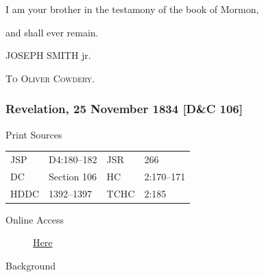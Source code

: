 					\begin{tightright}
						I am your brother in the testamony of the book of Mormon,
					\end{tightright}
					
					\begin{tightcenter}
						and shall ever remain.
					\end{tightcenter}

					\begin{tightright}
						JOSEPH SMITH jr.
					\end{tightright}

					\textsc{To Oliver Cowdery}.

		\subsubsection{Revelation, 25 November 1834 [D\&C 106]}
			\label{EMS-1834-JS-25-NOV-1834}
			
			\begin{description}
					\item[Print Sources]
				\end{description}

					\begin{tabular}{p{0.5in}p{1in}p{0.5in}p{1in}}
					JSP	 	& D4:180--182		& JSR 		& 266 \\
					DC	 	& Section 106		& HC 		& 2:170--171 \\
					HDDC 	& 1392--1397		& TCHC 		& 2:185 \\
					\end{tabular}
				
				\begin{description}
					\item[Online Access] \href{https://www.josephsmithpapers.org/paper-summary/revelation-25-november-1834-dc-106/1}{Here}
				\end{description}
				
				\begin{description}
					\item[Background]
				\end{description}
				
				
